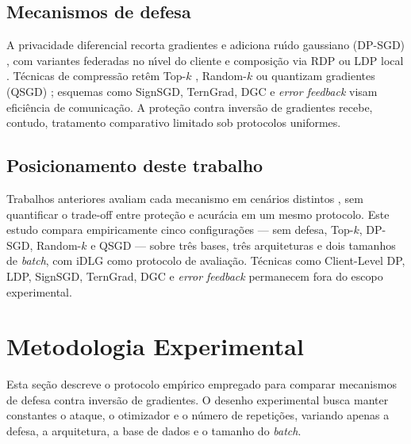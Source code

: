 \documentclass[kdmile,a4paper]{kdmile}
\begin{document}
\subsection{Mecanismos de defesa}

A privacidade diferencial recorta gradientes e adiciona ru\'{\i}do gaussiano (DP-SGD) \cite{Abadi2016}, com variantes federadas no n\'{\i}vel do cliente \cite{McMahan2018} e composi\c{c}\~{a}o via RDP \cite{Mironov2017} ou LDP local \cite{Duchi2013}. T\'{e}cnicas de compress\~{a}o ret\^{e}m Top-$k$ \cite{Stich2018}, Random-$k$ \cite{Wangni2018} ou quantizam gradientes (QSGD) \cite{Alistarh2017}; esquemas como SignSGD, TernGrad, DGC e \textit{error feedback} \cite{Bernstein2018,Wen2017,Lin2018,Karimireddy2019} visam efici\^{e}ncia de comunica\c{c}\~{a}o. A prote\c{c}\~{a}o contra invers\~{a}o de gradientes recebe, contudo, tratamento comparativo limitado sob protocolos uniformes.

\subsection{Posicionamento deste trabalho}

Trabalhos anteriores avaliam cada mecanismo em cen\'{a}rios distintos \cite{Zhu2019,Geiping2020,Abadi2016,Stich2018,Wangni2018,Alistarh2017}, sem quantificar o trade-off entre prote\c{c}\~{a}o e acur\'{a}cia em um mesmo protocolo. Este estudo compara empiricamente cinco configura\c{c}\~{o}es --- sem defesa, Top-$k$, DP-SGD, Random-$k$ e QSGD --- sobre tr\^{e}s bases, tr\^{e}s arquiteturas e dois tamanhos de \textit{batch}, com iDLG como protocolo de avalia\c{c}\~{a}o. T\'{e}cnicas como Client-Level DP, LDP, SignSGD, TernGrad, DGC e \textit{error feedback} permanecem fora do escopo experimental.

\section{Metodologia Experimental}
\label{sec:metodologia}

Esta se\c{c}\~{a}o descreve o protocolo emp\'{\i}rico empregado para comparar mecanismos de defesa contra invers\~{a}o de gradientes. O desenho experimental busca manter constantes o ataque, o otimizador e o n\'{u}mero de repeti\c{c}\~{o}es, variando apenas a defesa, a arquitetura, a base de dados e o tamanho do \textit{batch}.
\end{document}
